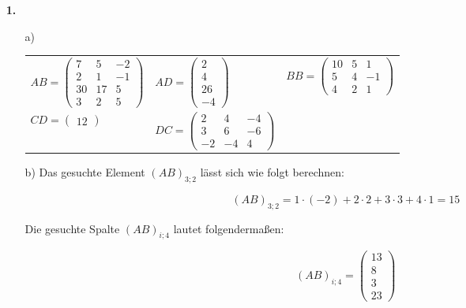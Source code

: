 \documentclass[a4paper,10pt]{scrartcl}
\author{\authorinfo}
\title{\titleinfo}
\date{\today}
\begin{document}
\setcounter{secnumdepth}{0}
\maketitle


\begin{enumerate}
    \item[\textbf{1.}]
        \begin{enumerate}
            \item[a)]
                \begin{tabular}[t]{lll}
                    $AB = \begin{pmatrix} 7 & 5 & -2 \\ 2 & 1 & -1 \\ 30 & 17 & 5 \\ 3 & 2 & 5 \end{pmatrix}$ &
                    $AD = \begin{pmatrix} 2 \\ 4 \\ 26 \\ -4 \end{pmatrix}$ &
                    $BB = \begin{pmatrix} 10 & 5 & 1 \\ 5 & 4 & -1 \\ 4 & 2 & 1 \end{pmatrix}$ \\[3em]
                    $CD = \begin{pmatrix} 12 \end{pmatrix}$ &
                    $DC = \begin{pmatrix} 2 & 4 & -4 \\ 3 & 6 & -6 \\ -2 & -4 & 4 \end{pmatrix}$
                \end{tabular}

            \item[b)]
                Das gesuchte Element $(AB)_{3;2}$ lässt sich wie folgt berechnen:

                $$(AB)_{3;2} = 1 \cdot (-2) + 2 \cdot 2 + 3 \cdot 3 + 4 \cdot 1 = 15$$

                Die gesuchte Spalte $(AB)_{i;4}$ lautet folgendermaßen:

                $$(AB)_{i;4} = \begin{pmatrix} 13 \\ 8 \\ 3 \\ 23 \end{pmatrix}$$


\end{enumerate}
\end{enumerate}
\end{document}
